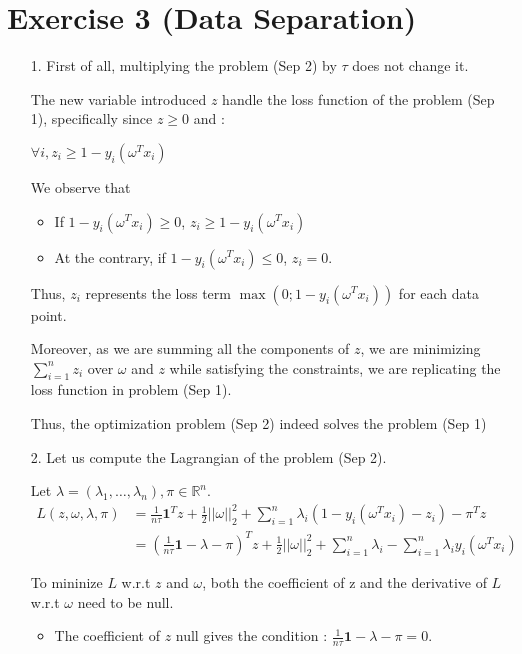 \documentclass{article}
\begin{document}
\section*{Exercise 3 (Data Separation)}
    \begin{itemize}
        \item [1.] First of all, multiplying the problem (Sep 2) by $\tau$ does not change it.

        The new variable introduced $z$ handle the loss function of the problem (Sep 1), specifically since $z\geq0$ and :

        $\forall i, z_i\geq 1-y_i(\omega^Tx_i)$

        We observe that 
        \begin{itemize}
            \item If $1-y_i(\omega^Tx_i)\geq0$, $z_i\geq1-y_i(\omega^Tx_i)$ 
            \item At the contrary, if $1-y_i(\omega^Tx_i)\leq0$, $z_i=0$.
        \end{itemize} 

        Thus, $z_i$ represents the loss term $\max(0;1-y_i(\omega^Tx_i))$ for each data point.
        
        Moreover, as we are summing all the components of $z$, we are minimizing $\sum_{i=1}^nz_i$ over $\omega$ and $z$ while satisfying the constraints, we are replicating the loss function in problem (Sep 1). 

        Thus, the optimization problem (Sep 2) indeed solves the problem (Sep 1)

        \item [2.] Let us compute the Lagrangian of the problem (Sep 2). 
        
        Let $\lambda=(\lambda_1, \dots, \lambda_n), \pi\in\mathbb{R}^n $.
        \begin{equation}
            \begin{align}
                L(z, \omega, \lambda, \pi) &= \frac{1}{n\tau}\mathbf{1}^Tz+\frac{1}{2}||\omega||_2^2+\sum_{i=1}^n\lambda_i(1-y_i(\omega^Tx_i)-z_i)-\pi^Tz \\
                &=(\frac{1}{n\tau}\mathbf{1}-\lambda-\pi)^Tz+\frac{1}{2}||\omega||_2^2+\sum_{i=1}^n\lambda_i-\sum_{i=1}^n\lambda_iy_i(\omega^Tx_i)
            \end{align}
        \end{equation}

        To mininize $L$ w.r.t $z$ and $\omega$, both the coefficient of z  and the derivative of $L$ w.r.t $\omega$ need to be null.
        \begin{itemize}
            \item The coefficient of $z$ null gives the condition : $\frac{1}{n\tau}\mathbf{1}-\lambda-\pi = 0$.
            

\end{itemize}
\end{itemize}
\end{document}
